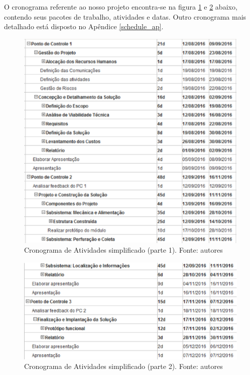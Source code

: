       O cronograma referente ao nosso projeto encontra-se na figura \ref{fig:cron_s1}
      e \ref{fig:cron_s2} abaixo, contendo seus pacotes de trabalho, atividades e datas. Outro
      cronograma mais detalhado está disposto no Apêndice \ref{schedule_ap}.

      \begin{figure}[!htbp]
        \centering
        \includegraphics[width=\textwidth]{figuras/cronograma_simples_1.eps}
        \caption{Cronograma de Atividades simplificado (parte 1). Fonte: autores}
        \label{fig:cron_s1}
      \end{figure}

      \clearpage

      \begin{figure}[!htbp]
        \centering
        \includegraphics[width=\textwidth]{figuras/cronograma_simples_2.eps}
        \caption{Cronograma de Atividades simplificado (parte 2). Fonte: autores}
        \label{fig:cron_s2}
      \end{figure}

